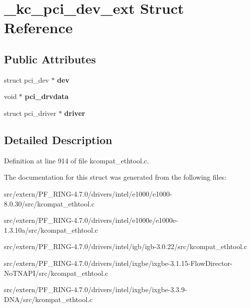 \hypertarget{struct__kc__pci__dev__ext}{
\section{\_\-kc\_\-pci\_\-dev\_\-ext Struct Reference}
\label{struct__kc__pci__dev__ext}
}
\subsection*{Public Attributes}
\begin{DoxyCompactItemize}
\item 
\hypertarget{struct__kc__pci__dev__ext_af10e2a860f8d9c121499af20154bf444}{
struct pci\_\-dev $\ast$ {\bfseries dev}}
\label{struct__kc__pci__dev__ext_af10e2a860f8d9c121499af20154bf444}

\item 
\hypertarget{struct__kc__pci__dev__ext_a1f17e8ec99a6bb660ae60bb018618e62}{
void $\ast$ {\bfseries pci\_\-drvdata}}
\label{struct__kc__pci__dev__ext_a1f17e8ec99a6bb660ae60bb018618e62}

\item 
\hypertarget{struct__kc__pci__dev__ext_ab7202d2d2cdcaf0756659d33609d212c}{
struct pci\_\-driver $\ast$ {\bfseries driver}}
\label{struct__kc__pci__dev__ext_ab7202d2d2cdcaf0756659d33609d212c}

\end{DoxyCompactItemize}


\subsection{Detailed Description}


Definition at line 914 of file kcompat\_\-ethtool.c.



The documentation for this struct was generated from the following files:\begin{DoxyCompactItemize}
\item 
src/extern/PF\_\-RING-\/4.7.0/drivers/intel/e1000/e1000-\/8.0.30/src/kcompat\_\-ethtool.c\item 
src/extern/PF\_\-RING-\/4.7.0/drivers/intel/e1000e/e1000e-\/1.3.10a/src/kcompat\_\-ethtool.c\item 
src/extern/PF\_\-RING-\/4.7.0/drivers/intel/igb/igb-\/3.0.22/src/kcompat\_\-ethtool.c\item 
src/extern/PF\_\-RING-\/4.7.0/drivers/intel/ixgbe/ixgbe-\/3.1.15-\/FlowDirector-\/NoTNAPI/src/kcompat\_\-ethtool.c\item 
src/extern/PF\_\-RING-\/4.7.0/drivers/intel/ixgbe/ixgbe-\/3.3.9-\/DNA/src/kcompat\_\-ethtool.c\end{DoxyCompactItemize}
